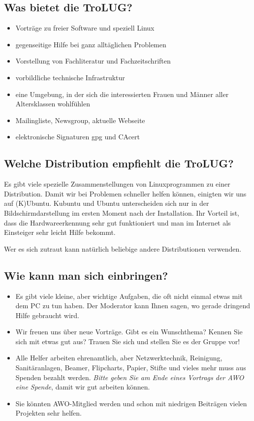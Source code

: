 \documentclass[a4paper,11pt,notumble]{leaflet}
\begin{document}
\subsection{Was bietet die TroLUG?}
\begin{itemize}
\item Vorträge zu freier Software und speziell Linux
\item gegenseitige Hilfe bei ganz alltäglichen Problemen
\item Vorstellung von Fachliteratur und Fachzeitschriften
\item vorbildliche technische Infrastruktur
\item eine Umgebung, in der sich die interessierten Frauen und Männer aller Altersklassen wohlfühlen
\item Mailingliste, Newsgroup, aktuelle Webseite
\item elektronische Signaturen gpg und CAcert
\end{itemize}



\subsection{Welche Distribution empfiehlt die TroLUG?}
Es gibt viele spezielle Zusammenstellungen von Linuxprogrammen zu einer Distribution. Damit wir bei Problemen schneller helfen können, einigten wir uns auf (K)Ubuntu. Kubuntu und Ubuntu unterscheiden sich nur in der Bildschirmdarstellung im ersten Moment nach der Installation. Ihr Vorteil ist, dass die Hardwareerkennung sehr gut funktioniert und man im Internet als Einsteiger sehr leicht Hilfe bekommt.

Wer es sich zutraut kann natürlich beliebige andere Distributionen verwenden. 

\subsection{Wie kann man sich einbringen?}
\begin{itemize}
\item Es gibt viele kleine, aber wichtige Aufgaben, die oft nicht einmal etwas mit dem PC zu tun haben. Der Moderator kann Ihnen sagen, wo gerade dringend Hilfe gebraucht wird.
\item Wir freuen uns über neue Vorträge. Gibt es ein Wunschthema? Kennen Sie sich mit etwas gut aus? Trauen Sie sich und stellen Sie es der Gruppe vor! 
\item Alle Helfer arbeiten ehrenamtlich, aber Netzwerktechnik, Reinigung, Sanitäranlagen, Beamer, Flipcharts, Papier, Stifte und vieles mehr muss aus Spenden bezahlt werden. \emph{Bitte geben Sie am Ende eines Vortrags der AWO eine Spende}, damit wir gut arbeiten können. 
\item Sie könnten AWO-Mitglied werden und schon mit niedrigen Beiträgen vielen Projekten sehr helfen. 
\end{itemize}
\end{document}
